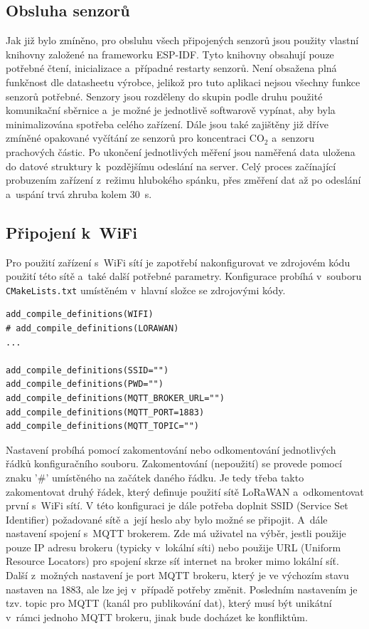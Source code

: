 \subsection{Obsluha senzorů}

Jak již bylo zmíněno, pro obsluhu všech připojených senzorů jsou použity vlastní knihovny založené na frameworku ESP-IDF. Tyto knihovny obsahují pouze potřebné čtení, inicializace a~případné restarty senzorů. Není obsažena plná funkčnost dle datasheetu výrobce, jelikož pro tuto aplikaci nejsou všechny funkce senzorů potřebné. Senzory jsou rozděleny do skupin podle druhu použité komunikační sběrnice a~je možné je jednotlivě softwarově vypínat, aby byla minimalizována spotřeba celého zařízení. Dále jsou také zajištěny již dříve zmíněné opakované vyčítání ze senzorů pro koncentraci CO$_2$ a~senzoru prachových částic. Po ukončení jednotlivých měření jsou naměřená data uložena do datové struktury k~pozdějšímu odeslání na server. Celý proces začínající probuzením zařízení z~režimu hlubokého spánku, přes změření dat až po odeslání a~uspání trvá zhruba kolem \SI{30}{\second}.

\subsection{Připojení k~WiFi}

Pro použití zařízení s~WiFi sítí je zapotřebí nakonfigurovat ve zdrojovém kódu použití této sítě a~také další potřebné parametry. Konfigurace probíhá v~souboru \texttt{CMakeLists.txt} umístěném v~hlavní složce se zdrojovými kódy.

\begin{lstlisting}[caption={Nastavení spojení pomocí WiFi}]
add_compile_definitions(WIFI)
# add_compile_definitions(LORAWAN)
...

add_compile_definitions(SSID="")
add_compile_definitions(PWD="")
add_compile_definitions(MQTT_BROKER_URL="")
add_compile_definitions(MQTT_PORT=1883)
add_compile_definitions(MQTT_TOPIC="")
\end{lstlisting}

Nastavení probíhá pomocí zakomentování nebo odkomentování jednotlivých řádků konfiguračního souboru. Zakomentování (nepoužití) se provede pomocí znaku '\#' umístěného na začátek daného řádku. Je tedy třeba takto zakomentovat druhý řádek, který definuje použití sítě LoRaWAN a~odkomentovat první s~WiFi sítí.
V této konfiguraci je dále potřeba doplnit SSID (Service Set Identifier) požadované sítě a~její heslo aby bylo možné se připojit. A~dále nastavení spojení s~MQTT brokerem. Zde má uživatel na výběr, jestli použije pouze IP adresu brokeru (typicky v~lokální síti) nebo použije URL (Uniform Resource Locators) pro spojení skrze síť internet na broker mimo lokální síť. Další z~možných nastavení je port MQTT brokeru, který je ve výchozím stavu nastaven na \SI{1883}{}, ale lze jej v~případě potřeby změnit. Posledním nastavením je tzv. topic pro MQTT (kanál pro publikování dat), který musí být unikátní v~rámci jednoho MQTT brokeru, jinak bude docházet ke konfliktům.


